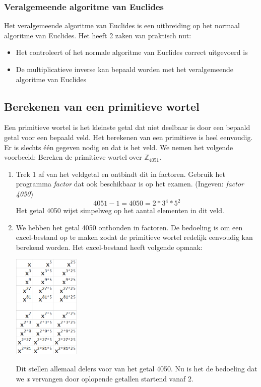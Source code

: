 \subsubsection{Veralgemeende algoritme van Euclides}
Het veralgemeende algoritme van Euclides is een uitbreiding op het normaal algoritme van Euclides. Het heeft 2 zaken van praktisch nut:

\begin{itemize}
 \item Het controleert of het normale algoritme van Euclides correct uitgevoerd is
 \item De multiplicatieve inverse kan bepaald worden met het veralgemeende algoritme van Euclides
\end{itemize}


\subsection{Berekenen van een primitieve wortel}
Een primitieve wortel is het kleinste getal dat niet deelbaar is door een bepaald getal voor een bepaald veld. Het berekenen van een primitieve is heel eenvoudig. 
Er is slechts één gegeven nodig en dat is het veld. We nemen het volgende voorbeeld: Bereken de primitieve wortel over $\mathbb{Z}_{4051}.$

\begin{enumerate}
 \item Trek 1 af van het veldgetal en ontbindt dit in factoren. Gebruik het programma {\it factor} dat ook beschikbaar is op het examen. (Ingeven: {\sl factor 4050}) 
  $$4051 - 1 = 4050 = 2 * 3^{4} * 5^{2}$$
  Het getal 4050 wijst simpelweg op het aantal elementen in dit veld.
 \item We hebben het getal 4050 ontbonden in factoren. De bedoeling is om een excel-bestand op te maken zodat de primitieve wortel redelijk eenvoudig kan berekend worden. 
 Het excel-bestand heeft volgende opmaak:
 \begin{center}
  \includegraphics[height=5cm]{priem_wortel_1}
  \label{fig:priem_wortel_1}
 \end{center}

 Dit stellen allemaal delers voor van het getal 4050. Nu is het de bedoeling dat we {\sl x} vervangen door oplopende getallen startend vanaf 2. 
 \end{enumerate}


